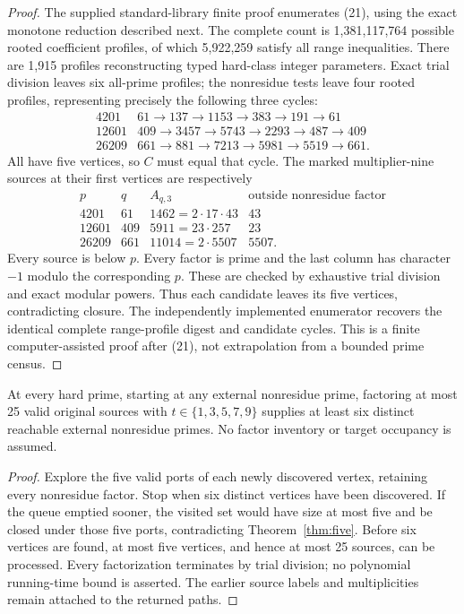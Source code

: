 \begin{proof}
The supplied standard-library finite proof enumerates (21), using the exact
monotone reduction described next. The complete count is 1,381,117,764 possible
rooted coefficient profiles, of which 5,922,259 satisfy all range inequalities.
There are 1,915 profiles reconstructing typed hard-class integer parameters.
Exact trial division leaves six all-prime profiles; the nonresidue tests leave
four rooted profiles, representing precisely the following three cycles:
\[
\begin{array}{r|l}
4201&61\to137\to1153\to383\to191\to61\\
12601&409\to3457\to5743\to2293\to487\to409\\
26209&661\to881\to7213\to5981\to5519\to661.
\end{array}                                                    \tag{22}
\]
All have five vertices, so $C$ must equal that cycle. The marked multiplier-nine
sources at their first vertices are respectively
\[
\begin{array}{r|r|l|r}
p&q&A_{q,3}&\text{outside nonresidue factor}\\\hline
4201&61&1462=2\cdot17\cdot43&43\\
12601&409&5911=23\cdot257&23\\
26209&661&11014=2\cdot5507&5507.
\end{array}                                                    \tag{23}
\]
Every source is below $p$. Every factor is prime and the last column has character
$-1$ modulo the corresponding $p$. These are checked by exhaustive trial division
and exact modular powers. Thus each candidate leaves its five vertices, contradicting
closure. The independently implemented enumerator recovers the identical complete
range-profile digest and candidate cycles. This is a finite computer-assisted
proof after (21), not extrapolation from a bounded prime census.
\end{proof}

\begin{corollary}
At every hard prime, starting at any external nonresidue prime, factoring at most
25 valid original sources with $t\in\{1,3,5,7,9\}$ supplies at least six distinct
reachable external nonresidue primes. No factor inventory or target occupancy is
assumed.
\end{corollary}
\begin{proof}
Explore the five valid ports of each newly discovered vertex, retaining every
nonresidue factor. Stop when six distinct vertices have been discovered. If the
queue emptied sooner, the visited set would have size at most five and be closed
under those five ports, contradicting Theorem~\ref{thm:five}. Before six vertices
are found, at most five vertices, and hence at most 25 sources, can be processed.
Every factorization terminates by trial division; no polynomial running-time bound
is asserted. The earlier source labels and multiplicities remain attached to the
returned paths.
\end{proof}

